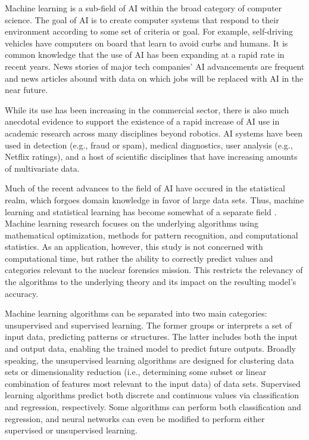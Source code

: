 Machine learning is a sub-field of \gls{AI} within the broad category of
computer science. The goal of \gls{AI} is to create computer systems that
respond to their environment according to some set of criteria or goal. For
example, self-driving vehicles have computers on board that learn to avoid
curbs and humans. It is common knowledge that the use of \gls{AI} has been
expanding at a rapid rate in recent years. News stories of major tech
companies' \gls{AI} advancements are frequent and news articles abound with
data on which jobs will be replaced with \gls{AI} in the near future. 

While its use has been increasing in the commercial sector, there is also much
anecdotal evidence to support the existence of a rapid increase of \gls{AI} use
in academic research across many disciplines beyond robotics. \gls{AI} systems
have been used in detection (e.g., fraud or spam), medical diagnostics, user
analysis (e.g., Netflix ratings), and a host of scientific disciplines that
have increasing amounts of multivariate data.

Much of the recent advances to the field of \gls{AI} have occured in the
statistical realm, which forgoes domain knowledge in favor of large data sets.
Thus, machine learning and statistical learning has become somewhat of a
separate field \cite{changingml}. Machine learning research focuses on the
underlying algorithms using mathematical optimization, methods for pattern
recognition, and computational statistics.  As an application, however, this
study is not concerned with computational time, but rather the ability to
correctly predict values and categories relevant to the nuclear forensics
mission. This restricts the relevancy of the algorithms to the underlying
theory and its impact on the resulting model's accuracy. 

Machine learning algorithms can be separated into two main categories:
unsupervised and supervised learning.  The former groups or interprets a set of
input data, predicting patterns or structures. The latter includes both the
input and output data, enabling the trained model to predict future outputs.
Broadly speaking, the unsupervised learning algorithms are designed for
clustering data sets or dimensionality reduction (i.e., determining some subset
or linear combination of features most relevant to the input data) of data
sets.  Supervised learning algorithms predict both discrete and continuous
values via classification and regression, respectively. Some algorithms can
perform both classification and regression, and neural networks can even be
modified to perform either supervised or unsupervised learning. 

